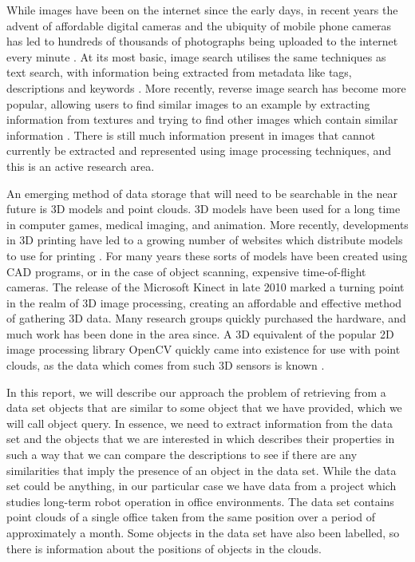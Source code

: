 \documentclass[11pt,a4paper]{kth-mag}
\begin{document}
While images have been on the internet since the early days, in recent years the
advent of affordable digital cameras and the ubiquity of mobile phone cameras
has led to hundreds of thousands of photographs being uploaded to the internet
every minute \cite{fbipo,photosminute}. At its most basic, image search utilises
the same techniques as text search, with information being extracted from
metadata like tags, descriptions and keywords \cite{jing2008pagerank}. More
recently, reverse image search has become more popular, allowing users to find
similar images to an example by extracting information from textures and trying
to find other images which contain similar information \cite{lew2006content}.
There is still much information present in images that cannot currently be
extracted and represented using image processing techniques, and this is an
active research area.

An emerging method of data storage that will need to be searchable in the near
future is 3D models and point clouds. 3D models have been used for a long time
in computer games, medical imaging, and animation. More recently, developments
in 3D printing have led to a growing number of websites which distribute models
to use for printing \cite{3dprintlist}. For many years these sorts of models
have been created using CAD programs, or in the case of object scanning,
expensive time-of-flight cameras. The release of the Microsoft Kinect in late
2010 marked a turning point in the realm of 3D image processing, creating an
affordable and effective method of gathering 3D data. Many research groups
quickly purchased the hardware, and much work has been done in the area since. A
3D equivalent of the popular 2D image processing library OpenCV quickly came
into existence for use with point clouds, as the data which comes from such 3D
sensors is known \cite{opencv, pcl}.

In this report, we will describe our approach the problem of retrieving from a
data set objects that are similar to some object that we have provided, which we
will call object query. In essence, we need to extract information from the data
set and the objects that we are interested in which describes their properties
in such a way that we can compare the descriptions to see if there are any
similarities that imply the presence of an object in the data set. While the
data set could be anything, in our particular case we have data from a project
which studies long-term robot operation in office environments. The data set
contains point clouds of a single office taken from the same position over a period
of approximately a month. Some objects in the data set have also been labelled,
so there is information about the positions of objects in the clouds.
\end{document}
